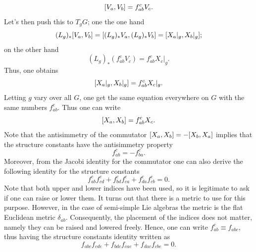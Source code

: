 \begin{equation}
    [V_a,V_b] = f_{ab}^cV_c.
\end{equation}
Let's then push this to $T_gG$; one the one hand
\begin{equation}
    (L_g)_*[V_a,V_b] = [(L_g)_*V_a,(L_g)_*V_b] = [X_a|_g,X_b|_g];
\end{equation}
on the other hand
\begin{equation}
    (L_g)_*(f_{ab}^cV_c) = f_{ab}^cX_c|_g.
\end{equation}
Thus, one obtains 
\begin{equation}
    [X_a|_g,X_b|_g] = f_{ab}^cX_c|_g.
\end{equation}
Letting $g$ vary over all $G$, one get the same equation everywhere on $G$ with the same numbers $f_{ab}^c$. Thus one can write 
\begin{equation}
    [X_a,X_b] = f_{ab}^cX_c.
\end{equation}
Note that the antisimmetry of the commutator $[X_a,X_b] = -[X_b,X_a]$ implies that the structure constants have the antisimmetry property
\begin{equation}
    f_{ab}^c = -f_{ba}^c.
\end{equation}
Moreover, from the Jacobi identity for the commutator one can also derive the following identity for the structure constants 
\begin{equation}
    f_{ab}^cf_{cd}^e + f_{bd}^cf_{ca}^e + f_{da}^cf_{cb}^e = 0.
\end{equation}
Note that both upper and lower indices have been used, so it is legitimate to ask if one can raise or lower them. It turns out that there is a metric to use for this purpose. However, in the case of semi-simple Lie algebras the metric is the flat Euclidean metric $\delta_{ab}$. Consequently, the placement of the indices does not matter, namely they can be raised and lowered freely. Hence, one can write $f_{ab}^c \equiv f_{abc}$, thus having the structure constants identity written as
\begin{equation}
    f_{abc}f_{cde} + f_{bdc}f_{cae} + f_{dac}f_{cbe} = 0.
\end{equation}

